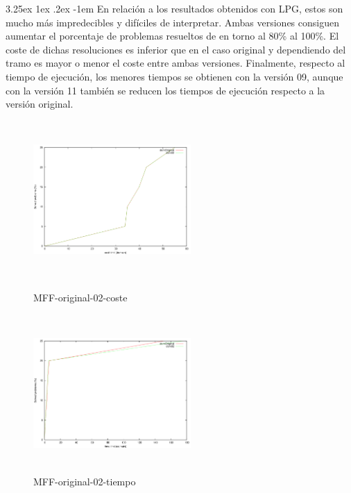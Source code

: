 \documentclass{article}
\makeatletter
\renewcommand\paragraph{\@startsection{paragraph}{5}{\z@}%
  {3.25ex \@plus1ex \@minus.2ex}%
  {-1em}%
  {\normalfont\normalsize\bfseries}}
\makeatother
\begin{document}
\paragraph{}
En relación a los resultados obtenidos con LPG, estos son mucho más impredecibles y difíciles de interpretar. Ambas versiones consiguen aumentar el porcentaje de problemas resueltos de en torno al 80\% al 100\%. El coste de dichas resoluciones es inferior que en el caso original y dependiendo del tramo es mayor o menor el coste entre ambas versiones. Finalmente, respecto al tiempo de ejecución, los menores tiempos se obtienen con la versión 09, aunque con la versión 11 también se reducen los tiempos de ejecución respecto a la versión original.



\pagebreak

\begin{figure}[!htb]
   \begin{minipage}{0.48\textwidth}
     \centering
     \includegraphics[width=6cm, height=6cm]{mff-or-02-cost}
    \caption{MFF-original-02-coste}
   \end{minipage}\hfill
   \begin {minipage}{0.48\textwidth}
     \centering
     \includegraphics[width=6cm, height=6cm]{mff-or-02-time}
    \caption{MFF-original-02-tiempo}
   \end{minipage}
\end{figure}
\end{document}
